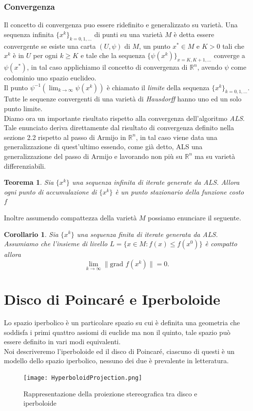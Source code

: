 \documentclass[a4paper, 12pt]{article}
\newtheorem{theorem}{Teorema}
\newtheorem{corollary}{Corollario}
\begin{document}
\subsubsection{Convergenza}
Il concetto di convergenza puo essere ridefinito e generalizzato su varietà. Una sequenza infinita $\{x^k\}_{k=0,1,...}$ di punti su una varietà $M$ è detta essere convergente se esiste una carta $(U, \psi)$ di $M$, un punto $x^\ast \in M$ e $K > 0$ tali che $x^k$ è in $U$ per ogni $k \geq K$ e tale che la sequenza $\{\psi(x^k)\}_{x=K, K+1, ...}$ converge a $\psi(x^\ast)$, in tal caso applichiamo il concetto di convergenza di $\mathbb{R}^n$, avendo $\psi$ come codominio uno spazio euclideo.\\
Il punto $\psi^{-1}(\lim_{k \to \infty} \psi(x^k))$ è chiamato il \emph{limite} della sequenza $\{x^k\}_{k=0,1,...}$.\\
Tutte le sequenze convergenti di una varietà di \emph{Hausdorff} hanno uno ed un solo punto limite.\\
Diamo ora un importante risultato rispetto alla convergenza dell'algoritmo \emph{ALS}.\\
Tale enunciato deriva direttamente dal risultato di convergenza definito nella sezione 2.2 rispetto al passo di Armijo in $\mathbb{R}^n$, in tal caso viene data una generalizzazione di quest'ultimo essendo, come già detto, ALS una generalizzazione del passo di Armijo e lavorando non più su $\mathbb{R}^n$ ma su varietà differenziabili.
\begin{theorem}
Sia $\{x^k\}$ una sequenza infinita di iterate generate da ALS. Allora ogni punto di accumulazione  di $\{x^k\}$ è un punto stazionario della funzione costo $f$
\end{theorem}
Inoltre assumendo compattezza della varietà $M$ possiamo enunciare il seguente.
\begin{corollary}
Sia $\{x^k\}$ una sequenza finita di iterate generata da ALS. Assumiamo che l'insieme di livello $L = \{x \in M : f(x) \leq f(x^0)\}$ è compatto allora\\
\[\lim_{k \to \infty} \parallel \mbox{grad } f(x^k) \parallel = 0.\]
\end{corollary}

\section{Disco di Poincaré e Iperboloide}
Lo spazio iperbolico è un particolare spazio su cui è definita una geometria che soddisfa i primi quattro assiomi di euclide ma non il quinto, tale spazio può essere definito in vari modi equivalenti.\\
Noi descriveremo l'iperboloide ed il disco di Poincaré, ciascuno di questi è un modello dello spazio iperbolico, nessuno dei due è prevalente in letteratura.\\
\begin{figure}[t] %
    \centering\texttt{[image: HyperboloidProjection.png]}
    \caption{Rappresentazione della proiezione stereografica tra disco e iperboloide}
\end{figure}
\end{document}
